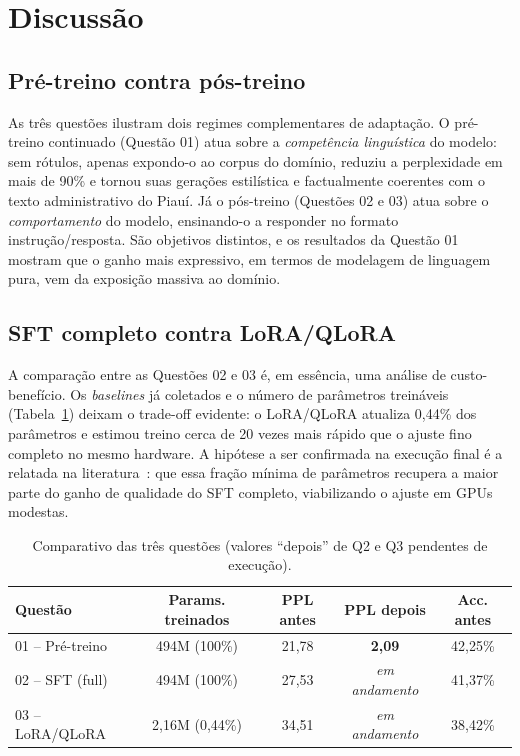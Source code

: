 \section{Discussão}
\label{sec:discussao}

\subsection{Pré-treino contra pós-treino}

As três questões ilustram dois regimes complementares de adaptação. O pré-treino
continuado (Questão 01) atua sobre a \emph{competência linguística} do modelo: sem
rótulos, apenas expondo-o ao corpus do domínio, reduziu a perplexidade em mais de
90\% e tornou suas gerações estilística e factualmente coerentes com o texto
administrativo do Piauí. Já o pós-treino (Questões 02 e 03) atua sobre o
\emph{comportamento} do modelo, ensinando-o a responder no formato
instrução/resposta. São objetivos distintos, e os resultados da Questão 01 mostram
que o ganho mais expressivo, em termos de modelagem de linguagem pura, vem da
exposição massiva ao domínio.

\subsection{SFT completo contra LoRA/QLoRA}

A comparação entre as Questões 02 e 03 é, em essência, uma análise de custo-benefício.
Os \textit{baselines} já coletados e o número de parâmetros treináveis
(Tabela~\ref{tab:comparativo}) deixam o trade-off evidente: o LoRA/QLoRA atualiza
0,44\% dos parâmetros e estimou treino cerca de 20 vezes mais rápido que o ajuste fino
completo no mesmo hardware. A hipótese a ser confirmada na execução final é a relatada
na literatura~\cite{hu2022lora,dettmers2023qlora}: que essa fração mínima de
parâmetros recupera a maior parte do ganho de qualidade do SFT completo, viabilizando
o ajuste em GPUs modestas.

\begin{table}[h]
  \centering
  \caption{Comparativo das três questões (valores ``depois'' de Q2 e Q3 pendentes de execução).}
  \label{tab:comparativo}
  \footnotesize
  \begin{tabularx}{\textwidth}{@{}l c c c c@{}}
    \toprule
    \textbf{Questão} & \textbf{Params. treinados} & \textbf{PPL antes} & \textbf{PPL depois} & \textbf{Acc. antes} \\
    \midrule
    01 -- Pré-treino   & 494M (100\%)   & 21,78 & \textbf{2,09} & 42,25\% \\
    02 -- SFT (full)   & 494M (100\%)   & 27,53 & \textit{em andamento} & 41,37\% \\
    03 -- LoRA/QLoRA   & 2,16M (0,44\%) & 34,51 & \textit{em andamento} & 38,42\% \\
    \bottomrule
  \end{tabularx}
\end{table}

